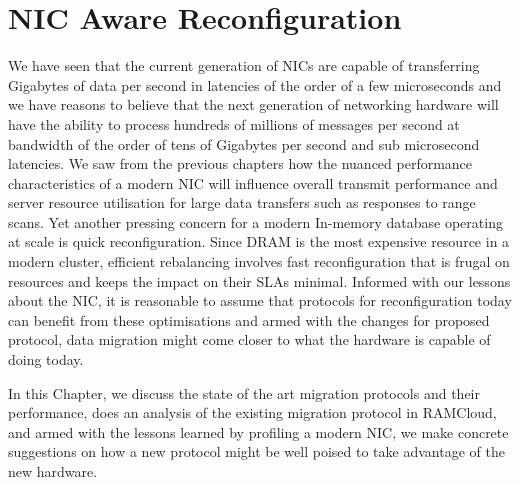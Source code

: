 
\chapter{NIC Aware Reconfiguration}
\label{chap:migration}
We have seen that the current generation of NICs are capable of transferring Gigabytes of 
data per second in latencies of the order of a few microseconds and we have reasons to believe 
that the next generation of networking hardware will have the ability to process 
hundreds of millions of messages per second at bandwidth of the order of tens of Gigabytes per 
second and sub microsecond latencies\cite{cx6}.
We saw from the previous chapters how the nuanced performance characteristics of 
a modern NIC will influence overall transmit performance and server resource utilisation 
for large data transfers such as responses to range scans. Yet another pressing 
concern for a modern In-memory database operating at scale is quick reconfiguration. 
Since DRAM is the most expensive resource in a modern cluster, efficient rebalancing 
involves fast reconfiguration that is frugal on resources and keeps the impact on their 
SLAs minimal. Informed with our lessons about the NIC, it is reasonable to assume that protocols for reconfiguration 
today can benefit from these optimisations and armed with the changes for proposed protocol, data migration might come 
closer to what the hardware is capable of doing today.

In this Chapter, we discuss the state of the art migration protocols and their 
performance, does an analysis of the existing migration protocol in RAMCloud, 
and armed with the lessons learned by profiling a modern NIC, we make concrete 
suggestions on how a new protocol might be well poised to take advantage of the 
new hardware.


